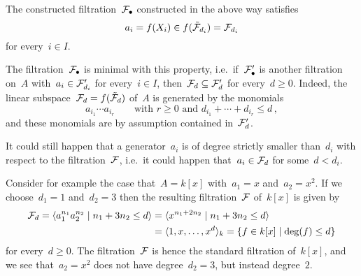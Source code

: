 The constructed filtration~$\mathcal{F}_\bullet$ constructed in the above way satisfies
\[
      a_i
  =   f(X_i)
  \in f(\tilde{\mathcal{F}}_{d_i})
  =   \mathcal{F}_{d_i}
\]
for every~$i \in I$.

\begin{remark}
  The filtration~$\mathcal{F}_\bullet$ is minimal with this property, i.e.\ if~$\mathcal{F}'_\bullet$ is another filtration on~$A$ with~$a_i \in \mathcal{F}'_{d_i}$ for every~$i \in I$, then~$\mathcal{F}_d \subseteq \mathcal{F}'_d$ for every~$d \geq 0$.
  Indeed, the linear subspace~$\mathcal{F}_d = f(\tilde{\mathcal{F}}_d)$ of~$A$ is generated by the monomials
  \[
    a_{i_1} \dotsm a_{i_r}
    \qquad
    \text{with~$r \geq 0$ and~$d_{i_1} + \dotsb + d_{i_r} \leq d$} \,,
  \]
  and these monomials are by assumption contained in~$\mathcal{F}'_d$.
\end{remark}

\begin{warning}
  It could still happen that a generator~$a_i$ is of degree strictly smaller than~$d_i$ with respect to the filtration~$\mathcal{F}$, i.e.\ it could happen that~$a_i \in \mathcal{F}_d$ for some~$d < d_i$.
  
  Consider for example the case that~$A = k[x]$ with~$a_1 = x$ and~$a_2 = x^2$.
  If we choose~$d_1 = 1$ and~$d_2 = 3$ then the resulting filtration~$\mathcal{F}$ of~$k[x]$ is given by
  \begin{align*}
        \Fcal_d
     =  \gen{
          a_1^{n_1} a_2^{n_2}
        \suchthat
          n_1 + 3 n_2 \leq d
        }
    &=  \gen{
          x^{n_1 + 2 n_2}
        \suchthat
          n_1 + 3 n_2 \leq d
        } \\
    &=  \gen{1, x, \dotsc, x^d}_k
     =  \{
          f \in k[x]
        \suchthat
          \deg(f) \leq d
        \}
  \end{align*}
  for every~$d \geq 0$.
  The filtration~$\mathcal{F}$ is hence the standard filtration of~$k[x]$, and we see that~$a_2 = x^2$ does not have degree~$d_2 = 3$, but instead degree~$2$.
\end{warning}

